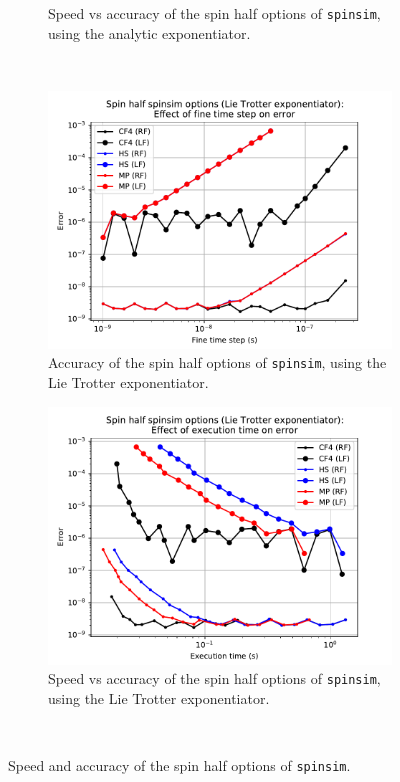 \documentclass{jors}
\begin{document}
\begin{figure}[h!]
\begin{subfigure}[b]{0.45\textwidth}
					\caption{Speed vs accuracy of the spin half options of \texttt{spinsim}, using the analytic exponentiator.}
					\label{fig:benchmark_spin_half_execution_error}
				\end{subfigure}\
				\vfill
				\begin{subfigure}[b]{0.45\textwidth}
					\includegraphics[scale=0.45]{benchmark_spin_half_trotter_step_error.pdf}
					\caption{Accuracy of the spin half options of \texttt{spinsim}, using the Lie Trotter exponentiator.}
					\label{fig:benchmark_spin_half_trotter_step_error}
				\end{subfigure}
				\hfill
				\begin{subfigure}[b]{0.45\textwidth}
					\includegraphics[scale=0.45]{benchmark_spin_half_trotter_execution_error.pdf}
					\caption{Speed vs accuracy of the spin half options of \texttt{spinsim}, using the Lie Trotter exponentiator.}
					\label{fig:benchmark_spin_half_trotter_execution_error}
				\end{subfigure}\
				\caption{Speed and accuracy of the spin half options of \texttt{spinsim}.}
				\label{fig:benchmark_spin_half}
			\end{figure}
\end{document}
